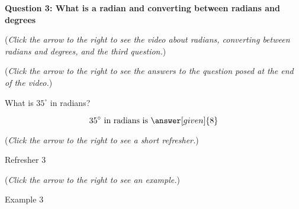 \documentclass{ximera}
\begin{document}
\textbf{Question 3: What is a radian and converting between radians and degrees}
\begin{question}
\begin{flushright}
{\color{blue}(\emph{Click the arrow to the right to see the video about radians, converting between radians and degrees, and the third question.})}
\end{flushright}
\begin{center}
\begin{expandable}
{\color{blue}(\emph{Click the arrow to the right to see the answers 
to the question posed at the end of the video.})}
\begin{expandable}
What is $35^\circ$ in radians?
\begin{prompt}
\[
35^\circ\text{ in radians is }\answer[given]{8}
\]
\end{prompt}
\begin{flushright}
{\color{blue}(\emph{Click the arrow to the right to see a short refresher.})}
\end{flushright}
\begin{expandable}
Refresher 3
\end{expandable}
\begin{flushright}
{\color{blue}(\emph{Click the arrow to the right to see an example.})}
\end{flushright}
\begin{expandable}
Example 3
\end{expandable}
\end{expandable}
\end{expandable}
\end{center}
\end{question}
\end{document}
